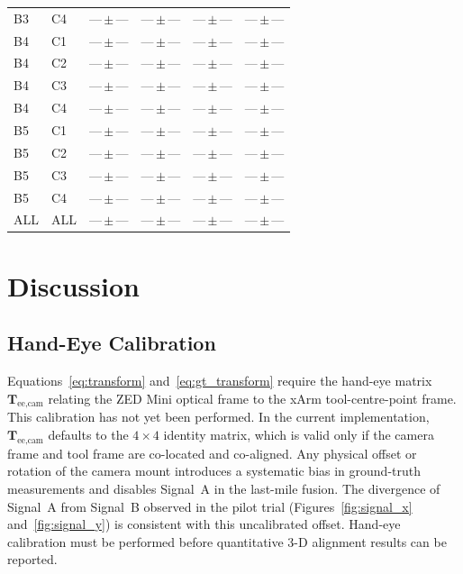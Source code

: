 \documentclass[lettersize,journal]{IEEEtran}
\begin{document}
\begin{table}[t]
\begin{tabular}{@{}llcccc@{}}
    B3 & C4 & ---\,$\pm$\,--- & ---\,$\pm$\,--- & ---\,$\pm$\,--- & ---\,$\pm$\,--- \\
    B4 & C1 & ---\,$\pm$\,--- & ---\,$\pm$\,--- & ---\,$\pm$\,--- & ---\,$\pm$\,--- \\
    B4 & C2 & ---\,$\pm$\,--- & ---\,$\pm$\,--- & ---\,$\pm$\,--- & ---\,$\pm$\,--- \\
    B4 & C3 & ---\,$\pm$\,--- & ---\,$\pm$\,--- & ---\,$\pm$\,--- & ---\,$\pm$\,--- \\
    B4 & C4 & ---\,$\pm$\,--- & ---\,$\pm$\,--- & ---\,$\pm$\,--- & ---\,$\pm$\,--- \\
    B5 & C1 & ---\,$\pm$\,--- & ---\,$\pm$\,--- & ---\,$\pm$\,--- & ---\,$\pm$\,--- \\
    B5 & C2 & ---\,$\pm$\,--- & ---\,$\pm$\,--- & ---\,$\pm$\,--- & ---\,$\pm$\,--- \\
    B5 & C3 & ---\,$\pm$\,--- & ---\,$\pm$\,--- & ---\,$\pm$\,--- & ---\,$\pm$\,--- \\
    B5 & C4 & ---\,$\pm$\,--- & ---\,$\pm$\,--- & ---\,$\pm$\,--- & ---\,$\pm$\,--- \\
    \midrule
    ALL & ALL & ---\,$\pm$\,--- & ---\,$\pm$\,--- & ---\,$\pm$\,--- & ---\,$\pm$\,--- \\
    \bottomrule
  \end{tabular}
\end{table}


\section{Discussion}
\label{sec:discussion}

\subsection{Hand-Eye Calibration}

Equations~\eqref{eq:transform} and~\eqref{eq:gt_transform} require the
hand-eye matrix $\mathbf{T}_{\text{ee,cam}}$ relating the ZED Mini optical
frame to the xArm tool-centre-point frame.  This calibration has not yet
been performed.  In the current implementation, $\mathbf{T}_{\text{ee,cam}}$
defaults to the $4\times4$ identity matrix, which is valid only if the
camera frame and tool frame are co-located and co-aligned.  Any physical
offset or rotation of the camera mount introduces a systematic bias in
ground-truth measurements and disables Signal~A in the last-mile fusion.
The divergence of Signal~A from Signal~B observed in the pilot trial
(Figures~\ref{fig:signal_x} and~\ref{fig:signal_y}) is consistent with
this uncalibrated offset.  Hand-eye calibration must be performed before
quantitative 3-D alignment results can be reported.
\end{document}
